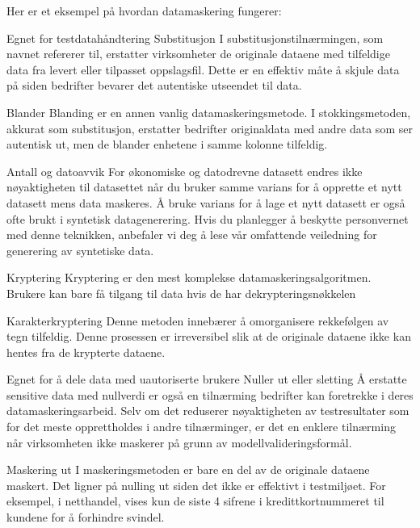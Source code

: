 \documentclass[letterpaper,10pt,english]{jupyterBook}
\begin{document}
\sphinxAtStartPar
Her er et eksempel på hvordan datamaskering fungerer:



\sphinxAtStartPar
Egnet for testdatahåndtering
Substitusjon
I substitusjonstilnærmingen, som navnet refererer til, erstatter virksomheter de originale dataene med tilfeldige data fra levert eller tilpasset oppslagsfil. Dette er en effektiv måte å skjule data på siden bedrifter bevarer det autentiske utseendet til data.

\sphinxAtStartPar
Blander
Blanding er en annen vanlig datamaskeringsmetode. I stokkingsmetoden, akkurat som substitusjon, erstatter bedrifter originaldata med andre data som ser autentisk ut, men de blander enhetene i samme kolonne tilfeldig.

\sphinxAtStartPar
Antall og datoavvik
For økonomiske og datodrevne datasett endres ikke nøyaktigheten til datasettet når du bruker samme varians for å opprette et nytt datasett mens data maskeres. Å bruke varians for å lage et nytt datasett er også ofte brukt i syntetisk datagenerering. Hvis du planlegger å beskytte personvernet med denne teknikken, anbefaler vi deg å lese vår omfattende veiledning for generering av syntetiske data.

\sphinxAtStartPar
Kryptering
Kryptering er den mest komplekse datamaskeringsalgoritmen. Brukere kan bare få tilgang til data hvis de har dekrypteringsnøkkelen

\noindent{}

\sphinxAtStartPar
Karakterkryptering
Denne metoden innebærer å omorganisere rekkefølgen av tegn tilfeldig. Denne prosessen er irreversibel slik at de originale dataene ikke kan hentes fra de krypterte dataene.

\sphinxAtStartPar
Egnet for å dele data med uautoriserte brukere
Nuller ut eller sletting
Å erstatte sensitive data med nullverdi er også en tilnærming bedrifter kan foretrekke i deres datamaskeringsarbeid. Selv om det reduserer nøyaktigheten av testresultater som for det meste opprettholdes i andre tilnærminger, er det en enklere tilnærming når virksomheten ikke maskerer på grunn av modellvalideringsformål.

\sphinxAtStartPar
Maskering ut
I maskeringsmetoden er bare en del av de originale dataene maskert. Det ligner på nulling ut siden det ikke er effektivt i testmiljøet. For eksempel, i netthandel, vises kun de siste 4 sifrene i kredittkortnummeret til kundene for å forhindre svindel.
\end{document}
